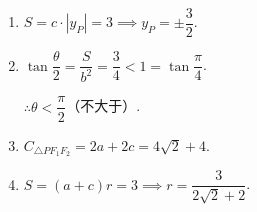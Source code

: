 \documentclass{article}
\begin{document}
\begin{enumerate}[label=\arabic*.]
	\item $S=c\cdot|y_P|=3 \implies y_P=\pm\dfrac{3}{2}$.
	
	\item $\tan\dfrac{\theta}{2}=\dfrac{S}{b^2}=\dfrac{3}{4}<1=\tan\dfrac{\pi}{4}$.
	
	$\therefore \theta<\dfrac{\pi}{2}$（不大于）.
	
	\item $C_{\triangle PF_1F_2}=2a+2c=4\sqrt{2}+4$.
	
	\item $S=(a+c)r=3 \implies r=\dfrac{3}{2\sqrt{2}+2}$.
	
\end{enumerate}
\end{document}
